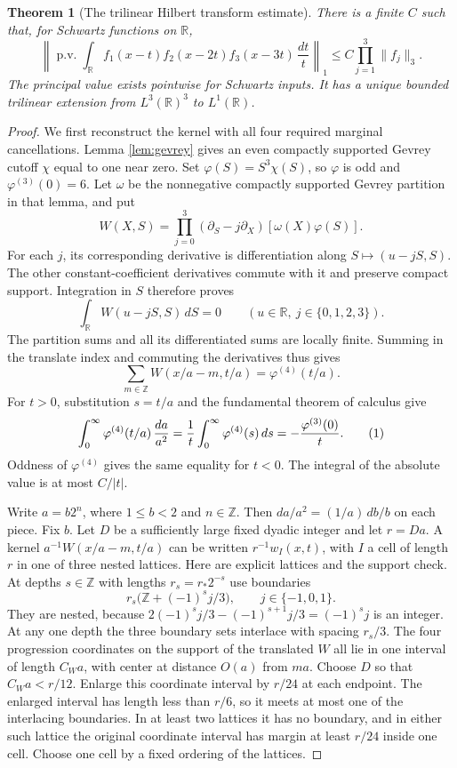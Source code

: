 \documentclass[11pt]{article}
\newtheorem{theorem}{Theorem}[section]
\theoremstyle{definition}
\newcommand{\R}{\mathbb R}
\newcommand{\Z}{\mathbb Z}
\newcommand{\eqtag}[1]{\refstepcounter{equation}\tag{\theequation}\label{#1}}
\numberwithin{equation}{section}
\begin{document}
\begin{theorem}[The trilinear Hilbert transform estimate]\label{thm:main}
There is a finite $C$ such that, for Schwartz functions on $\R$,
\[
 \left\|\operatorname{p.v.}\int_\R f_1(x-t)f_2(x-2t)f_3(x-3t)\,\frac{dt}{t}\right\|_1
 \le C\prod_{j=1}^3\|f_j\|_3.
\]
The principal value exists pointwise for Schwartz inputs. It has a unique bounded trilinear extension from $L^3(\R)^3$ to $L^1(\R)$.
\end{theorem}
\begin{proof}
We first reconstruct the kernel with all four required marginal cancellations. Lemma \ref{lem:gevrey} gives an even compactly supported Gevrey cutoff $\chi$ equal to one near zero. Set $\varphi(S)=S^3\chi(S)$, so $\varphi$ is odd and $\varphi^{(3)}(0)=6$. Let $\omega$ be the nonnegative compactly supported Gevrey partition in that lemma, and put
\[
 W(X,S)=\prod_{j=0}^3(\partial_S-j\partial_X)[\omega(X)\varphi(S)].
\]
For each $j$, its corresponding derivative is differentiation along $S\mapsto(u-jS,S)$. The other constant-coefficient derivatives commute with it and preserve compact support. Integration in $S$ therefore proves
\[
 \int_\R W(u-jS,S)\,dS=0\qquad(u\in\R,
 \ j\in\{0,1,2,3\}).
\]
The partition sums and all its differentiated sums are locally finite. Summing in the translate index and commuting the derivatives thus gives
\[
 \sum_{m\in\Z}W(x/a-m,t/a)=\varphi^{(4)}(t/a).
\]
For $t>0$, substitution $s=t/a$ and the fundamental theorem of calculus give
\[
 \int_0^\infty\varphi^{(4)}(t/a)\,\frac{da}{a^2}
 =\frac1t\int_0^\infty\varphi^{(4)}(s)\,ds
 =-\frac{\varphi^{(3)}(0)}t.
 \eqtag{eq:kernel-reconstruction}
\]
Oddness of $\varphi^{(4)}$ gives the same equality for $t<0$. The integral of the absolute value is at most $C/|t|$.

Write $a=b2^n$, where $1\le b<2$ and $n\in\Z$. Then $da/a^2=(1/a)\,db/b$ on each piece. Fix $b$. Let $D$ be a sufficiently large fixed dyadic integer and let $r=Da$. A kernel $a^{-1}W(x/a-m,t/a)$ can be written $r^{-1}w_I(x,t)$, with $I$ a cell of length $r$ in one of three nested lattices. Here are explicit lattices and the support check. At depths $s\in\Z$ with lengths $r_s=r_*2^{-s}$ use boundaries
\[
 r_s\bigl(\Z+(-1)^s j/3\bigr),\qquad j\in\{-1,0,1\}.
\]
They are nested, because $2(-1)^sj/3-(-1)^{s+1}j/3=(-1)^sj$ is an integer. At any one depth the three boundary sets interlace with spacing $r_s/3$. The four progression coordinates on the support of the translated $W$ all lie in one interval of length $C_Wa$, with center at distance $O(a)$ from $ma$. Choose $D$ so that $C_Wa<r/12$. Enlarge this coordinate interval by $r/24$ at each endpoint. The enlarged interval has length less than $r/6$, so it meets at most one of the interlacing boundaries. In at least two lattices it has no boundary, and in either such lattice the original coordinate interval has margin at least $r/24$ inside one cell. Choose one cell by a fixed ordering of the lattices.


\end{proof}
\end{document}

